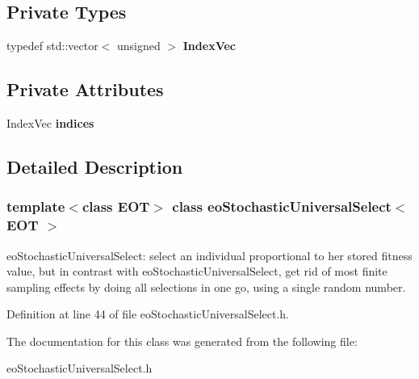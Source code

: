 \subsection*{Private Types}
\begin{CompactItemize}
\item 
typedef std::vector$<$ unsigned $>$ {\bf Index\-Vec}\label{classeo_stochastic_universal_select_y0}

\end{CompactItemize}
\subsection*{Private Attributes}
\begin{CompactItemize}
\item 
Index\-Vec {\bf indices}\label{classeo_stochastic_universal_select_r0}

\end{CompactItemize}


\subsection{Detailed Description}
\subsubsection*{template$<$class EOT$>$ class eo\-Stochastic\-Universal\-Select$<$ EOT $>$}

eo\-Stochastic\-Universal\-Select: select an individual proportional to her stored fitness value, but in contrast with eo\-Stochastic\-Universal\-Select, get rid of most finite sampling effects by doing all selections in one go, using a single random number. 



Definition at line 44 of file eo\-Stochastic\-Universal\-Select.h.

The documentation for this class was generated from the following file:\begin{CompactItemize}
\item 
eo\-Stochastic\-Universal\-Select.h\end{CompactItemize}
